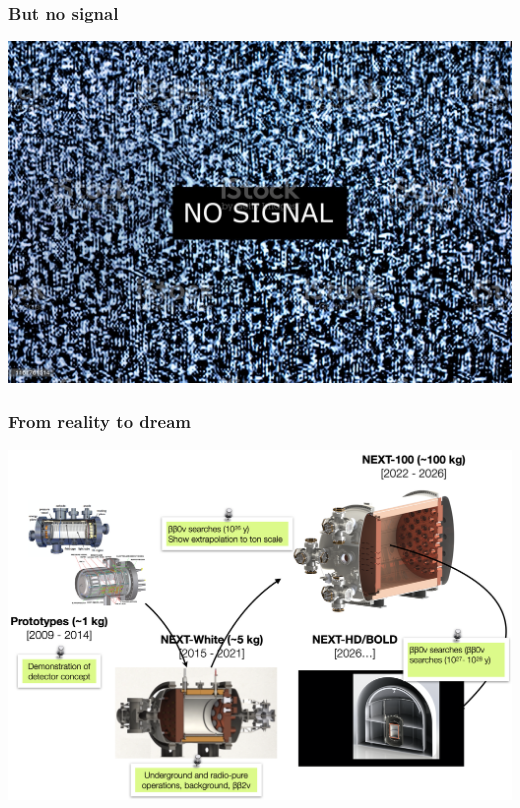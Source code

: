 \begin{frame}
\frametitle{But no signal}
\includegraphics[scale=1.00]{img/nosignal.jpg}
\end{frame}

\begin{frame}
\frametitle{From reality to dream}
\includegraphics[scale=0.20]{img/nextProgram.png}
\end{frame}


